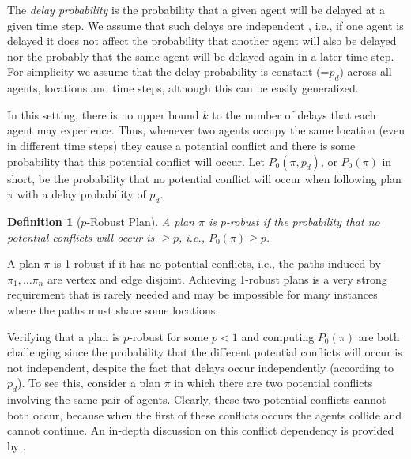 \documentclass{article}
\newcommand\Roni[1]{\nb{\textbf{Roni:}}{orange}{#1}}
\newcommand{\inlinecite}[1]{\citeauthor{#1} \shortcite{#1}}
\newtheorem{definition}{Definition}
\begin{document}
The {\em delay probability} is the probability that a given agent will be delayed at a given time step. We assume that such delays are independent 
, i.e., if one agent is delayed it does not affect the probability that another agent will also be delayed nor the probably that the same agent will be delayed again in a later time step. For simplicity we assume that the delay probability is constant (=$p_d$) across all agents, locations and time steps, although this can be easily generalized. 

In this setting, there is no upper bound $k$ to the number of delays that each agent may experience. Thus, whenever two agents occupy the same location (even in different time steps) they cause a potential conflict and there is some probability that this potential conflict will occur.  Let $P_0(\pi,p_d)$, or $P_0(\pi)$ in short, be the probability that no potential conflict will occur when following plan $\pi$ with a delay probability of $p_d$. 


\begin{definition}[$p$-Robust Plan]
A plan $\pi$ is $p$-robust if the probability that no potential conflicts will occur is $\geq p$, 
i.e., $P_0(\pi)\geq p$. 
\label{def:likelyRobust}
\end{definition}

A plan $\pi$ is 1-robust if it has no potential conflicts, i.e., the paths induced by $\pi_1,\ldots \pi_n$ are vertex and edge disjoint. Achieving 1-robust plans is a very strong requirement that is rarely needed and may be impossible for many instances where the paths must share some locations.


Verifying that a plan is $p$-robust for some $p<1$ and computing $P_0(\pi)$ are both challenging since the probability that the different potential conflicts will occur is not independent, despite the fact that delays occur independently (according to $p_d$). To see this, consider a plan $\pi$ in which there are two potential conflicts  involving the same pair of agents. %
Clearly, these two potential conflicts cannot both occur, 
because when the first of these conflicts occurs the agents collide and cannot continue.  An in-depth discussion on this conflict dependency is provided by \inlinecite{wagner2017path}.
\end{document}
